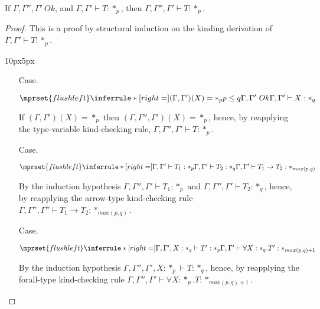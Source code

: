 \begin{lemma}
  If $\Gamma,\Gamma'',\Gamma'\ Ok$, and $\Gamma,\Gamma' \vdash
  T:*_p$, then $\Gamma,\Gamma'',\Gamma' \vdash T:*_p$.
  \label{lemma:context_weakening_for_kinding_ssf}
\end{lemma}
\begin{proof}
  This is a proof by structural induction on the kinding derivation of 
$\Gamma,\Gamma' \vdash T:*_p$.
\vspace{-25px}
\begin{changemargin}{10px}{5px}\noindent
\begin{itemize}
\item[Case.]\ \\
  \begin{center}
    \begin{math}
      $$\mprset{flushleft}
      \inferrule* [right=] {
        (\Gamma,\Gamma')(X) = *_p
	\\
	p \leq q
	\\
	\Gamma,\Gamma'\ Ok
      }{\Gamma,\Gamma' \vdash X : *_q}
    \end{math}
  \end{center}
  If $(\Gamma,\Gamma')(X) = *_p$ then $(\Gamma,\Gamma'',\Gamma')(X) = *_p$, hence, by 
  reapplying the type-variable kind-checking rule, $\Gamma,\Gamma'',\Gamma' \vdash T:*_p$.
\item[Case.]\ \\
  \begin{center}
    \begin{math}
      $$\mprset{flushleft}
      \inferrule* [right=] {
        \Gamma,\Gamma' \vdash T_1 : *_p
	\\
	\Gamma,\Gamma' \vdash T_2 : *_q
      }{\Gamma,\Gamma' \vdash T_1 \rightarrow T_2 : *_{max(p,q)}}
    \end{math}
  \end{center}
  By the induction hypothesis $\Gamma,\Gamma'',\Gamma' \vdash T_1:*_p$ and 
  $\Gamma,\Gamma'',\Gamma' \vdash T_2:*_q$,
  hence, by reapplying the arrow-type kind-checking rule 
  $\Gamma,\Gamma'',\Gamma'' \vdash T_1 \rightarrow T_2:*_{max(p,q)}$.

\item[Case.]\ \\
  \begin{center}
    \begin{math}
      $$\mprset{flushleft}
      \inferrule* [right=] {
        \Gamma,\Gamma',X : *_q \vdash T' : *_p
      }{\Gamma,\Gamma' \vdash \forall X:*_q.T' : *_{max(p,q)+1}}
    \end{math}
  \end{center}
  By the induction hypothesis $\Gamma,\Gamma'',\Gamma',X:*_p \vdash T:*_q$, hence, by 
  reapplying the forall-type
  kind-checking rule $\Gamma,\Gamma'',\Gamma' \vdash \forall X:*_p.T:*_{max(p,q)+1}$.
\end{itemize}
\end{changemargin}
\end{proof}

